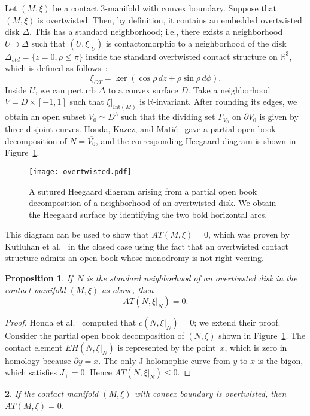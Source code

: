 \documentclass[11pt,oneside,english]{amsart}
\numberwithin{equation}{section}
\numberwithin{figure}{section}
\theoremstyle{definition}
\theoremstyle{plain}
\newtheorem{thm}{\protect\theoremname}
\newtheorem{prop}[thm]{Proposition}
\theoremstyle{plain}
\theoremstyle{remark}
\theoremstyle{plain}
\providecommand{\theoremname}{Theorem}
\begin{document}
Let $(M,\xi)$ be a contact $3$-manifold with convex boundary. Suppose that $(M,\xi)$
is overtwisted. Then, by definition, it contains an embedded overtwisted
disk $\Delta$. This has a standard neighborhood; i.e., there exists
a neighborhood $U\supset\Delta$ such that $(U,\xi|_{U})$ is contactomorphic
to a neighborhood of the disk $\Delta_{std}=\{z=0,\rho\le\pi\}$ inside
the standard overtwisted contact structure on $\mathbb{R}^{3}$, which is
defined as follows~\cite{key-8}:
\[
\xi_{OT}=\ker(\cos\rho \, dz+\rho\sin\rho\, d\phi).
\]
 Inside $U$, we can perturb $\Delta$ to a convex surface $D$. Take
a neighborhood $V=D\times [-1,1]$ such that $\xi|_{\text{Int}(M)}$ is $\mathbb{R}$-invariant.
After rounding its edges, we obtain an open subset $V_{0}\simeq D^3$
such that the dividing set $\Gamma_{V_{0}}$ on $\partial V_{0}$
is given by three disjoint curves. Honda, Kazez, and Mati\'c~\cite[Example~1]{key-1} gave a partial open
book decomposition of $N=\overline{V_{0}}$, and the corresponding Heegaard diagram is shown in Figure~\ref{fig:ot}.
\begin{figure}
\texttt{[image: overtwisted.pdf]}
\caption{A sutured Heegaard diagram arising from a partial open book decomposition of a neighborhood of an overtwisted disk.
We obtain the Heegaard surface by identifying the two bold horizontal arcs.}
\label{fig:ot}
\end{figure}
This diagram can be used to show that ${\mathit{AT}}(M,\xi)=0$,
which was proven by Kutluhan et al.~\cite{key-10} in the closed case using the fact that an overtwisted
contact structure admits an open book whose monodromy is not right-veering.

\begin{prop} \label{prop:ot}
If~$N$ is the standard neighborhood of an overtiwsted disk in the contact manifold $(M,\xi)$ as above,
then
\[
{\mathit{AT}}(N,\xi|_{N})=0.
\]
\end{prop}

\begin{proof}
Honda et al.~\cite[Example~1]{key-1} computed that $c(N,\xi|_{N}) = 0$;
we extend their proof. Consider the partial open book decomposition
of $(N,\xi)$ shown in Figure~\ref{fig:ot}.
The contact element $EH(N,\xi|_{N})$ is represented by the point~$x$,
which is zero in homology because $\partial y = x$. The only
J-holomophic curve from $y$ to $x$ is the bigon, which
satisfies $J_{+}=0$. Hence $AT(N,\xi|_{N})\le0$.
\end{proof}

\begin{thm} \label{thm:OT}
If the contact manifold $(M,\xi)$ with convex boundary is overtwisted, then $AT(M,\xi)=0$.
\end{thm}
\end{document}
